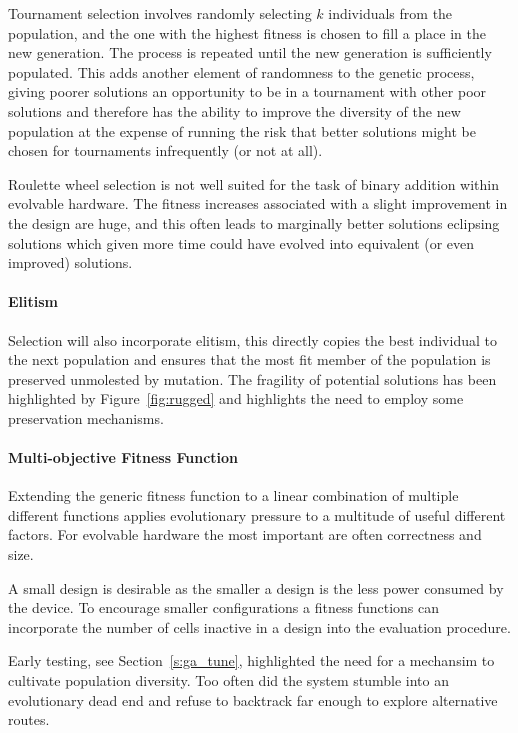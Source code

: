 Tournament selection involves randomly selecting $k$ individuals from the
population, and the one with the highest fitness is chosen to fill a place
in the new generation. The process is repeated until the new generation is
sufficiently populated. This adds another element of randomness to the
genetic process, giving poorer solutions an opportunity to be in a tournament
with other poor solutions and therefore has the ability to improve the
diversity of the new population at the expense of running the risk that
better solutions might be chosen for tournaments infrequently (or not at
all).

Roulette wheel selection is not well suited for the task of binary addition
within evolvable hardware. The fitness increases associated with a slight
improvement in the design are huge, and this often leads to marginally better
solutions eclipsing solutions which given more time could have evolved into
equivalent (or even improved) solutions.

\paragraph{Elitism}

Selection will also incorporate elitism, this directly copies the best individual
to the next population and ensures that the most fit member
of the population is preserved unmolested by mutation. The fragility of potential
solutions has been highlighted by Figure~\ref{fig:rugged} and highlights the
need to employ some preservation mechanisms.

\paragraph{Multi-objective Fitness Function}

Extending the generic fitness function to a linear combination of multiple different
functions applies evolutionary pressure to a multitude of useful different factors.
For evolvable hardware the most important are often correctness and size.

A small design is desirable as the smaller a design is the less power consumed
by the device. To encourage smaller configurations a fitness functions can
incorporate the number of cells inactive in a design into the evaluation
procedure.

Early testing, see Section~\ref{s:ga_tune}, highlighted the need for a mechansim to
cultivate population diversity. Too often did the system stumble into an evolutionary
dead end and refuse to backtrack far enough to explore alternative routes.

